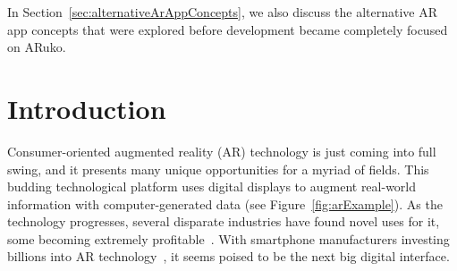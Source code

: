 \documentclass[a4paper, 10pt, american, titlepage]{article}
\begin{document}
In Section~\ref{sec:alternativeArAppConcepts}, we also discuss the alternative
AR app concepts that were explored before development became completely focused
on ARuko.

\clearpage

\begin{singlespace}
	\tableofcontents
	\clearpage

	\listoffigures
	\clearpage

	\listoftables
	\clearpage
\end{singlespace}


\section{Introduction}
\label{sec:introduction}

Consumer-oriented augmented reality (AR) technology is just coming into full
swing, and it presents many unique opportunities for a myriad of fields. This
budding technological platform uses digital displays to augment real-world
information with computer-generated data (see Figure~\ref{fig:arExample}). As
the technology progresses, several disparate industries have found novel uses
for it, some becoming extremely profitable~\autocite{webster2018}. With
smartphone manufacturers investing billions into AR
technology~\autocite{mason2016}, it seems poised to be the next big digital
interface.
\end{document}
